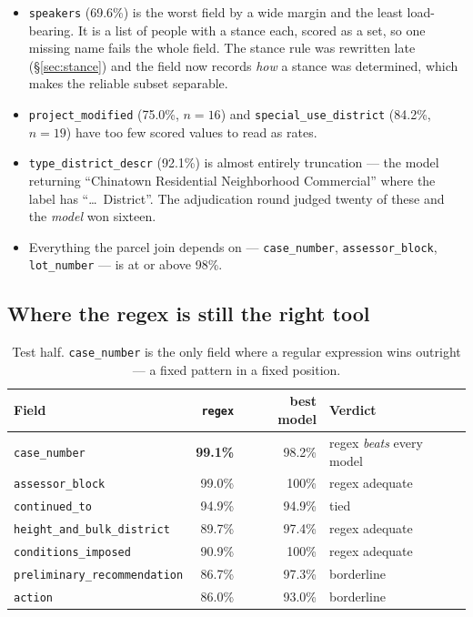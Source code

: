 \documentclass[11pt]{article}
\begin{document}
\begin{itemize}
\item \texttt{speakers} (69.6\%) is the worst field by a wide margin and the least
load-bearing. It is a list of people with a stance each, scored as a set, so one missing name
fails the whole field. The stance rule was rewritten late (\S\ref{sec:stance}) and the field
now records \emph{how} a stance was determined, which makes the reliable subset separable.
\item \texttt{project\_modified} (75.0\%, $n=16$) and \texttt{special\_use\_district}
(84.2\%, $n=19$) have too few scored values to read as rates.
\item \texttt{type\_district\_descr} (92.1\%) is almost entirely truncation --- the model
returning ``Chinatown Residential Neighborhood Commercial'' where the label has
``\ldots\ District''. The adjudication round judged twenty of these and the \emph{model} won
sixteen.
\item Everything the parcel join depends on --- \texttt{case\_number},
\texttt{assessor\_block}, \texttt{lot\_number} --- is at or above 98\%.
\end{itemize}

\subsection{Where the regex is still the right tool}

\begin{table}[h]
\centering
\begin{tabular}{lrrl}
\toprule
Field & \texttt{regex} & best model & Verdict \\
\midrule
\texttt{case\_number}                & \textbf{99.1\%} & 98.2\% & regex \emph{beats} every model \\
\texttt{assessor\_block}             & 99.0\% & 100\%  & regex adequate \\
\texttt{continued\_to}               & 94.9\% & 94.9\% & tied \\
\texttt{height\_and\_bulk\_district} & 89.7\% & 97.4\% & regex adequate \\
\texttt{conditions\_imposed}         & 90.9\% & 100\%  & regex adequate \\
\texttt{preliminary\_recommendation} & 86.7\% & 97.3\% & borderline \\
\texttt{action}                      & 86.0\% & 93.0\% & borderline \\
\bottomrule
\end{tabular}
\caption{Test half. \texttt{case\_number} is the only field where a regular expression wins
outright --- a fixed pattern in a fixed position.}
\end{table}
\end{document}
